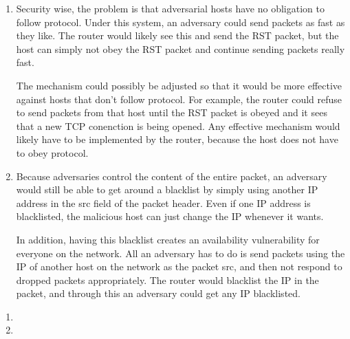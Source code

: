 \documentclass{jhwhw}
\begin{document}
\begin{enumerate}
\item Security wise, the problem is that adversarial hosts have no obligation to follow protocol. Under this system, an adversary could send packets as fast as they like. The router would likely see this and send the RST packet, but the host can simply not obey the RST packet and continue sending packets really fast. 

The mechanism could possibly be adjusted so that it would be more effective against hosts that don't follow protocol. For example, the router could refuse to send packets from that host until the RST packet is obeyed and it sees that a new TCP conenction is being opened. Any effective mechanism would likely have to be implemented by the router, because the host does not have to obey protocol.
\item Because adversaries control the content of the entire packet, an adversary would still be able to get around a blacklist by simply using another IP address in the src field of the packet header. Even if one IP address is blacklisted, the malicious host can just change the IP whenever it wants.

In addition, having this blacklist creates an availability vulnerability for everyone on the network. All an adversary has to do is send packets using the IP of another host on the network as the packet src, and then not respond to dropped packets appropriately. The router would blacklist the IP in the packet, and through this an adversary could get any IP blacklisted.
\end{enumerate}

\begin{enumerate}
\item 
\item
\end{enumerate}
\end{document}
